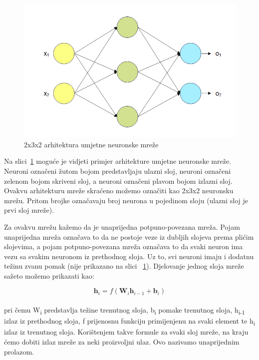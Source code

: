 \documentclass[times, utf8, zavrsni, numeric]{fer}
\begin{document}
\begin{figure}[htb]
    \centering
    \includegraphics{basic_nn_labeled.png}
    \caption{2x3x2 arhitektura umjetne neuronske mreže}
    \label{fig:basic_nn}
\end{figure}

Na slici~\ref{fig:basic_nn} moguće je vidjeti primjer arhitekture umjetne neuronske mreže. 
Neuroni označeni žutom bojom predstavljaju ulazni sloj, neuroni označeni zelenom bojom skriveni sloj, a neuroni označeni plavom bojom izlazni sloj. 
Ovakvu arhitekturu mreže skraćeno možemo označiti kao 2x3x2 neuronsku mrežu. Pritom brojke označavaju broj neurona u pojedinom sloju (ulazni sloj je prvi sloj mreže).

Za ovakvu mrežu kažemo da je unaprijedna potpuno-povezana mreža. 
Pojam unaprijedna mreža označava to da ne postoje veze iz dubljih slojeva prema plićim slojevima, a pojam potpuno-povezana mreža označava to da svaki neuron ima vezu sa svakim neuronom iz prethodnog sloja.
Uz to, svi neuroni imaju i dodatnu težinu zvanu pomak (nije prikazano na slici ~\ref{fig:basic_nn}). Djelovanje jednog sloja mreže sažeto možemo prikazati kao:

\begin{equation}
    \pmb{h}_{i} = f(\pmb{W}_{i} \pmb{h}_{i-1} + \pmb{b}_{i})
    \label{eq:nn_layer}
\end{equation}
\\
pri čemu W\textsubscript{i} predstavlja težine trenutnog sloja, b\textsubscript{i} pomake trenutnog sloja, h\textsubscript{i-1} izlaz iz prethodnog sloja, f prijenosnu funkciju primijenjenu na svaki element te h\textsubscript{i} izlaz iz trenutnog sloja.
Korištenjem takve formule za svaki sloj mreže, na kraju ćemo dobiti izlaz mreže za neki proizvoljni ulaz. Ovo nazivamo unaprijednim prolazom.
\end{document}
